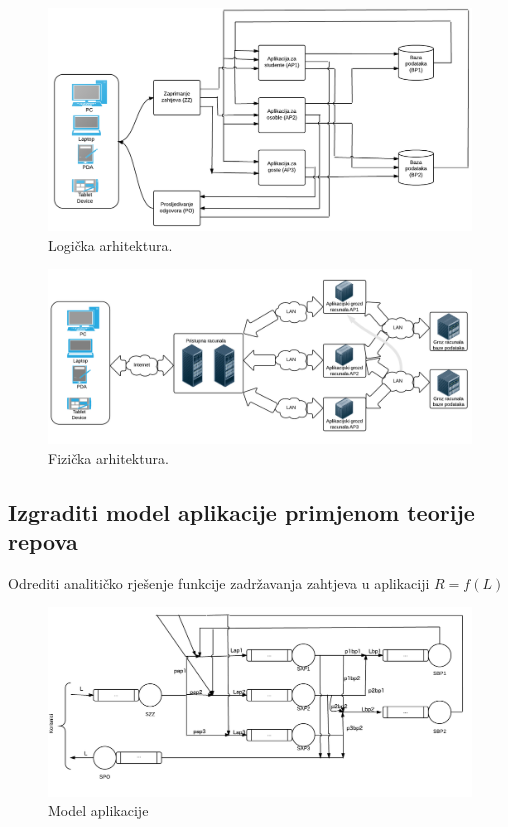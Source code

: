 \documentclass[11pt]{article}
\begin{document}
\begin{figure}[h!]
	\caption{Logička arhitektura.}
	\centering
	\includegraphics[width=1.3\textwidth,angle=90]{logicka.png}
\end{figure}

\newpage

\begin{figure}[h!]
	\caption{Fizička arhitektura.}
	\centering
	\includegraphics[width=1.3\textwidth,angle=90]{fizicka.png}
\end{figure}

\subsection{Izgraditi model aplikacije primjenom teorije repova}
Odrediti analitičko rješenje funkcije zadržavanja zahtjeva u aplikaciji $R = f(L)$

\begin{figure}[h!]
	\caption{Model aplikacije}
	\centering
	\includegraphics[width=1.2\textwidth,angle=90]{model.png}
\end{figure}
\end{document}
